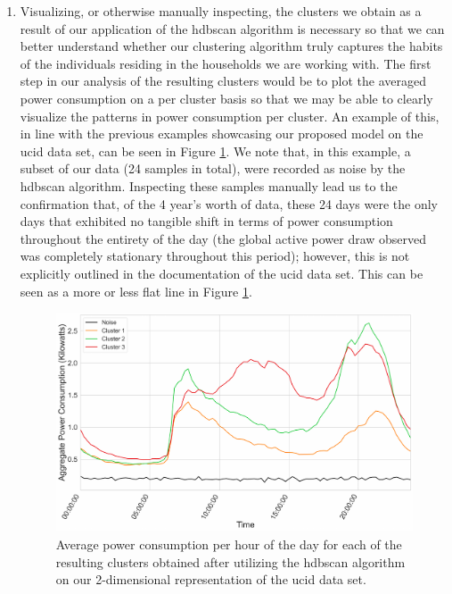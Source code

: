 \begin{adjustwidth}{-1.65cm}{-0.0cm}
\begin{enumerate}[label=Step 2.\arabic*:, leftmargin=*]
        \item Visualizing, or otherwise manually inspecting, the clusters we obtain as a result of our application of the \gls{hdbscan} algorithm is necessary so that we can better understand whether our clustering algorithm truly captures the habits of the individuals residing in the households we are working with. The first step in our analysis of the resulting clusters would be to plot the averaged power consumption on a per cluster basis so that we may be able to clearly visualize the patterns in power consumption per cluster. An example of this, in line with the previous examples showcasing our proposed model on the \gls{ucid} data set, can be seen in Figure \ref{fig:UCID-HDBSCAN-2}. We note that, in this example, a subset of our data (24 samples in total), were recorded as noise by the \gls{hdbscan} algorithm. Inspecting these samples manually lead us to the confirmation that, of the 4 year's worth of data, these 24 days were the only days that exhibited no tangible shift in terms of power consumption throughout the entirety of the day (\ie the global active power draw observed was completely stationary throughout this period); however, this is not explicitly outlined in the documentation of the \gls{ucid} data set. This can be seen as a more or less flat line in Figure \ref{fig:UCID-HDBSCAN-2}.
    
        \begin{figure}[hbt!]
            \centering
            \includegraphics[width=\textwidth]{Images/Chapter 5/Stage 2/UCID/UCID-HDBSCAN-2.pdf}
            \caption{Average power consumption per hour of the day for each of the resulting clusters obtained after utilizing the \gls{hdbscan} algorithm on our 2-dimensional representation of the \gls{ucid} data set.}
            \label{fig:UCID-HDBSCAN-2}
        \end{figure}
        

\end{enumerate}
\end{adjustwidth}
